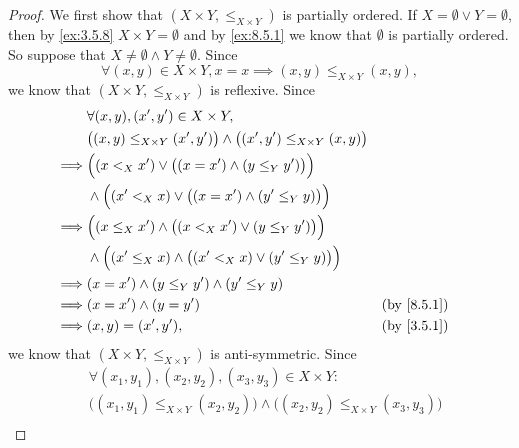 \begin{proof}
  We first show that \((X \times Y, \leq_{X \times Y})\) is partially ordered.
  If \(X = \emptyset \lor Y = \emptyset\), then by \cref{ex:3.5.8} \(X \times Y = \emptyset\) and by \cref{ex:8.5.1} we know that \(\emptyset\) is partially ordered.
  So suppose that \(X \neq \emptyset \land Y \neq \emptyset\).
  Since
  \[
    \forall (x, y) \in X \times Y, x = x \implies (x, y) \leq_{X \times Y} (x, y),
  \]
  we know that \((X \times Y, \leq_{X \times Y})\) is reflexive.
  Since
  \begin{align*}
             & \forall (x, y), (x', y') \in X \times Y,                                                                      \\
             & \big((x, y) \leq_{X \times Y} (x', y')\big) \land \big((x', y') \leq_{X \times Y} (x, y)\big)                 \\
    \implies & \Big((x <_X x') \lor \big((x = x') \land (y \leq_Y y')\big)\Big)                                              \\
             & \land \Big((x' <_X x) \lor \big((x = x') \land (y' \leq_Y y)\big)\Big)                                        \\
    \implies & \Big((x \leq_X x') \land \big((x <_X x') \lor (y \leq_Y y')\big)\Big)                                         \\
             & \land \Big((x' \leq_X x) \land \big((x' <_X x) \lor (y' \leq_Y y)\big)\Big)                                   \\
    \implies & (x = x') \land (y \leq_Y y') \land (y' \leq_Y y)                                                              \\
    \implies & (x = x') \land (y = y')                                                                       &  & \by{8.5.1} \\
    \implies & (x, y) = (x', y'),                                                                            &  & \by{3.5.1}
  \end{align*}
  we know that \((X \times Y, \leq_{X \times Y})\) is anti-symmetric.
  Since
  \begin{align*}
             & \forall (x_1, y_1), (x_2, y_2), (x_3, y_3) \in X \times Y :                                                               \\
             & \big((x_1, y_1) \leq_{X \times Y} (x_2, y_2)\big) \land \big((x_2, y_2) \leq_{X \times Y} (x_3, y_3)\big)                 \\

\end{align*}
\end{proof}

